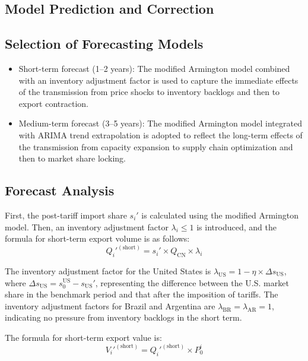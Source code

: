 \documentclass{apmcmthesis}
\begin{document}
\subsection{Model Prediction and Correction}
\subsection{Selection of Forecasting Models}
\begin{itemize}
    \item Short-term forecast (1–2 years): The modified Armington model combined with an inventory adjustment factor is used to capture the immediate effects of the transmission from price shocks to inventory backlogs and then to export contraction.

    \item Medium-term forecast (3–5 years): The modified Armington model integrated with ARIMA trend extrapolation is adopted to reflect the long-term effects of the transmission from capacity expansion to supply chain optimization and then to market share locking.
\end{itemize}

\subsection{Forecast Analysis}
First, the post-tariff import share $s_{i}'$ is calculated using the modified Armington model. Then, an inventory adjustment factor $\lambda_i \leq 1$ is introduced, and the formula for short-term export volume is as follows:
\begin{equation}
Q_{i}'^{(\text{short})} = s_{i}' \times Q_{\text{CN}} \times \lambda_{i}
\end{equation}

The inventory adjustment factor for the United States is $\lambda_{\text{US}} = 1 - \eta \times \Delta s_{\text{US}}$, where $\Delta s_{\text{US}} = s_{0}^{\text{US}} - s_{\text{US}}'$, representing the difference between the U.S. market share in the benchmark period and that after the imposition of tariffs.
The inventory adjustment factors for Brazil and Argentina are $\lambda_{\text{BR}} = \lambda_{\text{AR}} = 1$, indicating no pressure from inventory backlogs in the short term.

The formula for short-term export value is:
\begin{equation}
V_{i}'^{(\text{short})} = Q_{i}'^{(\text{short})} \times P_{0}^{i}
\end{equation}
\end{document}
